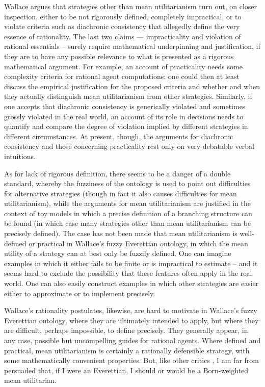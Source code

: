 \documentclass[aps,
pra,epsfig,12pt]{revtex4}
\begin{document}
Wallace argues that strategies other than
mean utilitarianism turn out, on closer inspection,
either to be not rigorously defined, completely impractical, or to violate
criteria such as diachronic consistency that allegedly define 
the very essence of rationality.  
The last two claims --- impracticality and violation of rational
essentials -- surely require mathematical underpinning and 
justification, if they are to have any possible relevance 
to what is presented as a rigorous
mathematical argument.   For example, an account of practicality  
needs some complexity criteria for rational agent
computations: one could then at least discuss the 
empirical justification for the proposed criteria and 
whether and when they actually distinguish
mean utilitarianism from other strategies.  
Similarly, if one accepts that diachronic consistency is 
generically violated and sometimes grossly
violated in the real world, an account of its role in decisions
needs to quantify and compare the degree of violation implied
by different strategies in different circumstances.  
At present, though, the arguments for diachronic consistency and
those concerning practicality rest only
on very debatable verbal intuitions.

As for lack of rigorous definition, there seems to be a danger of a double 
standard, whereby the fuzziness of the ontology is 
used to point out difficulties for alternative strategies (though
in fact it also causes difficulties for mean utilitarianism), while the 
arguments for mean utilitarianism are justified in the context of toy models 
in which a precise definition of a branching structure can be 
found (in which case many strategies other than mean utilitarianism
can be precisely defined).       
The case has not been made that mean utilitarianism is 
well-defined or practical in Wallace's fuzzy Everettian ontology, in which
the mean utility of a strategy can at best only be fuzzily defined.
One can imagine examples in which it either fails to be finite 
or is impractical to estimate -- and it 
seems hard to exclude the possibility that these features often
apply in the real world.  One can also easily 
construct examples in which other strategies are
easier either to approximate or to implement precisely.  
 
Wallace's rationality postulates, likewise, are hard to motivate
in Wallace's fuzzy Everettian ontology, where
they are ultimately intended to apply, but where they are 
difficult, perhaps impossible, to define precisely.  
They generally appear, in any case, possible but uncompelling
guides for rational agents.   Where defined and practical, mean 
utilitarianism is certainly a rationally defensible strategy, with 
some mathematically convenient properties.  But, like 
other critics \cite{pricevol, albertvol}, I am far from persuaded 
that, if I were an Everettian, I should or would be a Born-weighted mean utilitarian.  
\end{document}
